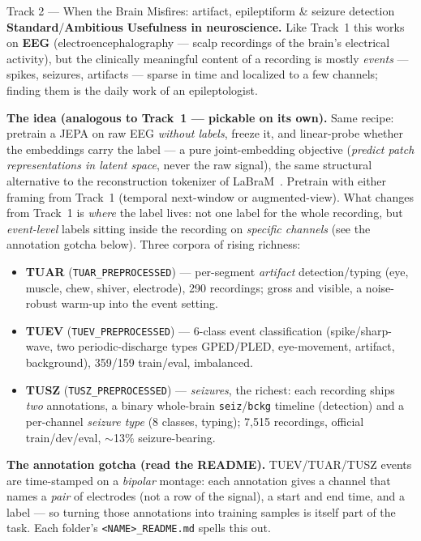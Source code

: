 \documentclass{article}
\newcommand{\code}[1]{\texttt{\small #1}}
\newcommand{\diffmed}{\colorbox{ebamber!18}{\textcolor{ebamber}{\small\bfseries Standard}}}
\newcommand{\diffhard}{\colorbox{ebred!15}{\textcolor{ebred}{\small\bfseries Ambitious}}}
\begin{document}
\begin{trackbox}{Track 2 --- When the Brain Misfires: artifact, epileptiform \& seizure detection \hfill \diffmed{}/\diffhard{}}
\textbf{Usefulness in neuroscience.} Like Track~1 this works on \textbf{EEG}
(electroencephalography --- scalp recordings of the brain's electrical activity), but the
clinically meaningful content of a recording is mostly \emph{events} --- spikes,
seizures, artifacts --- sparse in time and localized to a few channels; finding them is
the daily work of an epileptologist.

\smallskip
\textbf{The idea (analogous to Track~1 --- pickable on its own).} Same recipe: pretrain a
JEPA on raw EEG \emph{without labels}, freeze it, and linear-probe whether the embeddings
carry the label --- a pure joint-embedding objective (\emph{predict patch representations
in latent space}, never the raw signal), the same structural alternative to the
reconstruction tokenizer of LaBraM~\citep{LaBraM}. Pretrain with either framing from Track~1 (temporal next-window
or augmented-view). What changes from Track~1 is \emph{where} the label lives: not
one label for the whole recording, but \emph{event-level} labels sitting inside the
recording on \emph{specific channels} (see the annotation gotcha below). Three corpora of
rising richness:
\begin{itemize}[leftmargin=1.4em,itemsep=1pt,topsep=2pt]
  \item \textbf{TUAR} (\code{TUAR\_PREPROCESSED}) --- per-segment \emph{artifact}
    detection/typing (eye, muscle, chew, shiver, electrode), 290 recordings; gross
    and visible, a noise-robust warm-up into the event setting.
  \item \textbf{TUEV} (\code{TUEV\_PREPROCESSED}) --- 6-class event classification
    (spike/sharp-wave, two periodic-discharge types GPED/PLED, eye-movement, artifact,
    background), 359/159 train/eval, imbalanced.
  \item \textbf{TUSZ} (\code{TUSZ\_PREPROCESSED}) --- \emph{seizures}, the richest:
    each recording ships \emph{two} annotations, a binary whole-brain
    \code{seiz}/\code{bckg} timeline (detection) and a per-channel \emph{seizure
    type} (8 classes, typing); 7{,}515 recordings, official train/dev/eval,
    $\sim$13\% seizure-bearing.
\end{itemize}

\smallskip
\textbf{The annotation gotcha (read the README).} TUEV/TUAR/TUSZ events are
time-stamped on a \emph{bipolar} montage: each annotation gives a channel that names a
\emph{pair} of electrodes (not a row of the signal), a start and end time, and a label
--- so turning those annotations into training samples is itself part of the task. Each
folder's \code{<NAME>\_README.md} spells this out.


\end{trackbox}
\end{document}
